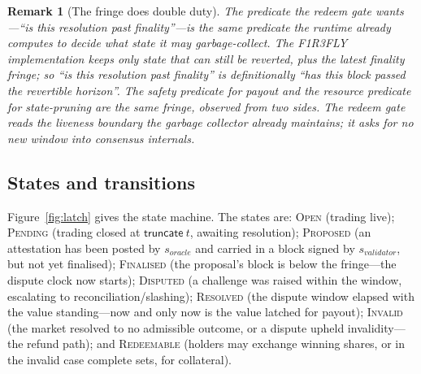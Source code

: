 \documentclass[11pt]{article}
\newtheorem{remark}{Remark}[section]
\begin{document}
\begin{remark}[The fringe does double duty]
The predicate the redeem gate wants---``is this resolution past finality''---is the same
predicate the runtime already computes to decide what state it may garbage-collect. The
F1R3FLY implementation keeps only state that can still be reverted, plus the latest finality
fringe; so ``is this resolution past finality'' is definitionally ``has this block passed the
revertible horizon''. The safety predicate for payout and the resource predicate for
state-pruning are the same fringe, observed from two sides. The redeem gate reads the
liveness boundary the garbage collector already maintains; it asks for no new window into
consensus internals.
\end{remark}

\subsection{States and transitions}

Figure~\ref{fig:latch} gives the state machine. The states are: \textsc{Open} (trading live);
\textsc{Pending} (trading closed at $\textsf{truncate}\ t$, awaiting resolution);
\textsc{Proposed} (an attestation has been posted by $s_{\mathit{oracle}}$ and carried in a
block signed by $s_{\mathit{validator}}$, but not yet finalised); \textsc{Finalised}
(the proposal's block is below the fringe---the dispute clock now starts); \textsc{Disputed}
(a challenge was raised within the window, escalating to reconciliation/slashing);
\textsc{Resolved} (the dispute window elapsed with the value standing---now and only now is the
value latched for payout); \textsc{Invalid} (the market resolved to no admissible outcome, or a
dispute upheld invalidity---the refund path); and \textsc{Redeemable} (holders may exchange
winning shares, or in the invalid case complete sets, for collateral).
\end{document}
